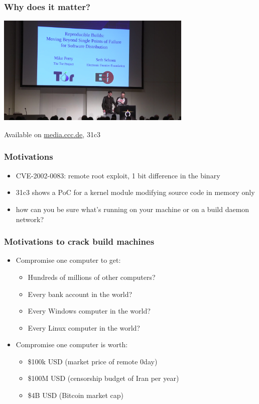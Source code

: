 \documentclass[14pt]{beamer}
\begin{document}
\begin{frame}[fragile]
 \frametitle{Why does it matter?}

 \begin{center}
  \includegraphics[width=0.7\textwidth]{images/31c3.png}

  Available on \url{media.ccc.de}, 31c3
 \end{center}
\end{frame}

\begin{frame}[fragile]
 \frametitle{Motivations}
 \begin{itemize}
  \item CVE-2002-0083: remote root exploit, 1 bit difference in the binary
  \item 31c3 shows a PoC for a kernel module modifying source code in memory only
  \item how can you be sure what's running on your machine or on a build
  daemon network?
 \end{itemize}
\end{frame}

\begin{frame}[fragile]
 \frametitle{Motivations to crack build machines}
 \begin{itemize}
  \item Compromise one computer to get:
  \begin{itemize}
   \item Hundreds of millions of other computers?
   \item Every bank account in the world?
   \item Every Windows computer in the world?
   \item Every Linux computer in the world?
  \end{itemize}
  \item Compromise one computer is worth:
  \begin{itemize}
   \item \$100k USD (market price of remote 0day)
   \item \$100M USD (censorship budget of Iran per year)
   \item \$4B USD (Bitcoin market cap)
  \end{itemize}
 \end{itemize}
\end{frame}
\end{document}
